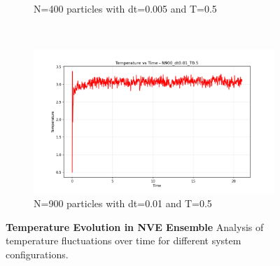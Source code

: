 \begin{figure}[H]
\begin{subfigure}{0.5\textwidth}
		\caption{N=400 particles with dt=0.005 and T=0.5}
		\label{sfig:temp_N400_dt0005}
	\end{subfigure}%
	~
	\begin{subfigure}{0.5\textwidth}
		\includegraphics[width=\textwidth]{media/temp_N900_dt0.01_T0.5.png}
		\caption{N=900 particles with dt=0.01 and T=0.5}
		\label{sfig:temp_N900}
	\end{subfigure}%


	\caption{\textbf{Temperature Evolution in NVE Ensemble} 
	Analysis of temperature fluctuations over time for different system configurations.}
	\label{fig:temperature_evolution}
\end{figure}
